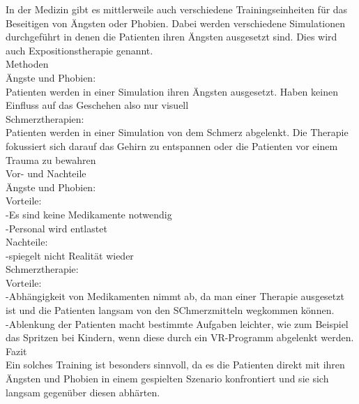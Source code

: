
In der Medizin gibt es mittlerweile auch verschiedene Trainingseinheiten für das Beseitigen von Ängsten oder Phobien. Dabei werden verschiedene Simulationen durchgeführt in denen die Patienten ihren Ängsten ausgesetzt sind. Dies wird auch Expositionstherapie genannt.\\

Methoden\\
Ängste und Phobien:\\
Patienten werden in einer Simulation ihren Ängsten ausgesetzt. Haben keinen Einfluss auf das Geschehen also nur visuell\\

Schmerztherapien:\\
Patienten werden in einer Simulation von dem Schmerz abgelenkt. Die Therapie fokussiert sich darauf das Gehirn zu entspannen oder die Patienten vor einem Trauma zu bewahren\\

Vor- und Nachteile\\

Ängste und Phobien:\\
Vorteile:\\
-Es sind keine Medikamente notwendig\\
-Personal wird entlastet\\
Nachteile:\\
-spiegelt nicht Realität wieder\\

Schmerztherapie:\\
Vorteile:\\
-Abhängigkeit von Medikamenten nimmt ab, da man einer Therapie ausgesetzt ist und die Patienten langsam von den SChmerzmitteln wegkommen können.\\
-Ablenkung der Patienten macht bestimmte Aufgaben leichter, wie zum Beispiel das Spritzen bei Kindern, wenn diese durch ein VR-Programm abgelenkt werden.\\

Fazit\\
Ein solches Training ist besonders sinnvoll, da es die Patienten direkt mit ihren Ängsten und Phobien in einem gespielten Szenario konfrontiert und sie sich langsam gegenüber diesen abhärten.





